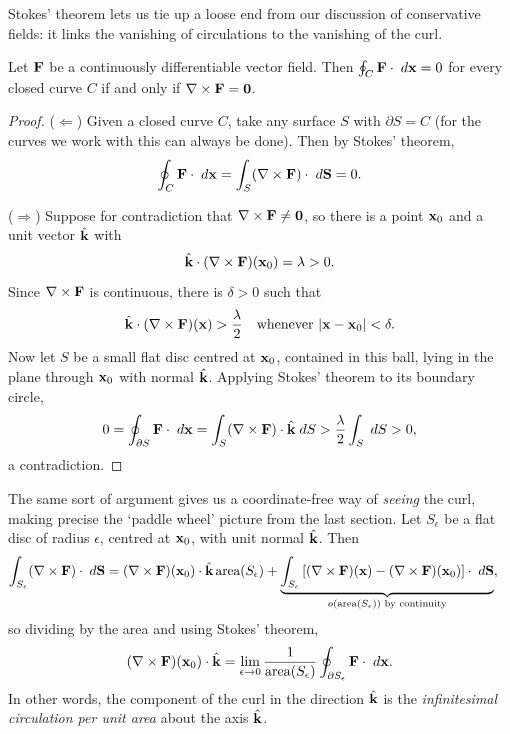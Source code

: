 \documentclass[a4paper]{scrartcl}
\begin{document}
Stokes' theorem lets us tie up a loose end from our discussion of conservative fields: it links the vanishing of circulations to the vanishing of the curl.

\begin{proposition}
	Let $\mathbf{F}$ be a continuously differentiable vector field. Then $\oint_C \mathbf{F} \cdot \; d \mathbf{x} = 0$ for every closed curve $C$ if and only if $\nabla \times \mathbf{F} = \mathbf{0}$.
\end{proposition}
\begin{proof}
	($\Leftarrow$) Given a closed curve $C$, take any surface $S$ with $\partial S = C$ (for the curves we work with this can always be done). Then by Stokes' theorem,
	$$
	\oint_C \mathbf{F} \cdot \; d \mathbf{x} = \int_S (\nabla \times \mathbf{F}) \cdot \; d \mathbf{S} = 0.
	$$

	($\Rightarrow$) Suppose for contradiction that $\nabla \times \mathbf{F} \neq \mathbf{0}$, so there is a point $\mathbf{x}_0$ and a unit vector $\hat{\mathbf{k}}$ with
	$$
	\hat{\mathbf{k}} \cdot (\nabla \times \mathbf{F})(\mathbf{x}_0) = \lambda > 0.
	$$
	Since $\nabla \times \mathbf{F}$ is continuous, there is $\delta > 0$ such that
	$$
	\hat{\mathbf{k}} \cdot (\nabla \times \mathbf{F})(\mathbf{x}) > \frac{\lambda}{2} \quad \text{whenever } |\mathbf{x} - \mathbf{x}_0| < \delta.
	$$
	Now let $S$ be a small flat disc centred at $\mathbf{x}_0$, contained in this ball, lying in the plane through $\mathbf{x}_0$ with normal $\hat{\mathbf{k}}$. Applying Stokes' theorem to its boundary circle,
	$$
	0 = \oint_{\partial S} \mathbf{F} \cdot \; d \mathbf{x} = \int_S (\nabla \times \mathbf{F}) \cdot \hat{\mathbf{k}} \; d S > \frac{\lambda}{2} \int_S \; d S > 0,
	$$
	a contradiction.
\end{proof}

The same sort of argument gives us a coordinate-free way of \emph{seeing} the curl, making precise the `paddle wheel' picture from the last section. Let $S_\epsilon$ be a flat disc of radius $\epsilon$, centred at $\mathbf{x}_0$, with unit normal $\hat{\mathbf{k}}$. Then
\begin{align*}
	\int_{S_\epsilon} (\nabla \times \mathbf{F}) \cdot \; d \mathbf{S} &= (\nabla \times \mathbf{F})(\mathbf{x}_0) \cdot \hat{\mathbf{k}} \, \text{area}(S_\epsilon) + \underbrace{\int_{S_\epsilon} \left[(\nabla \times \mathbf{F})(\mathbf{x}) - (\nabla \times \mathbf{F})(\mathbf{x}_0)\right] \cdot \; d \mathbf{S}}_{o(\text{area}(S_\epsilon)) \text{ by continuity}},
\end{align*}
so dividing by the area and using Stokes' theorem,
$$
(\nabla \times \mathbf{F})(\mathbf{x}_0) \cdot \hat{\mathbf{k}} = \lim_{\epsilon \to 0} \frac{1}{\text{area}(S_\epsilon)} \oint_{\partial S_\epsilon} \mathbf{F} \cdot \; d \mathbf{x}.
$$
In other words, the component of the curl in the direction $\hat{\mathbf{k}}$ is the \emph{infinitesimal circulation per unit area} about the axis $\hat{\mathbf{k}}$.
\end{document}
